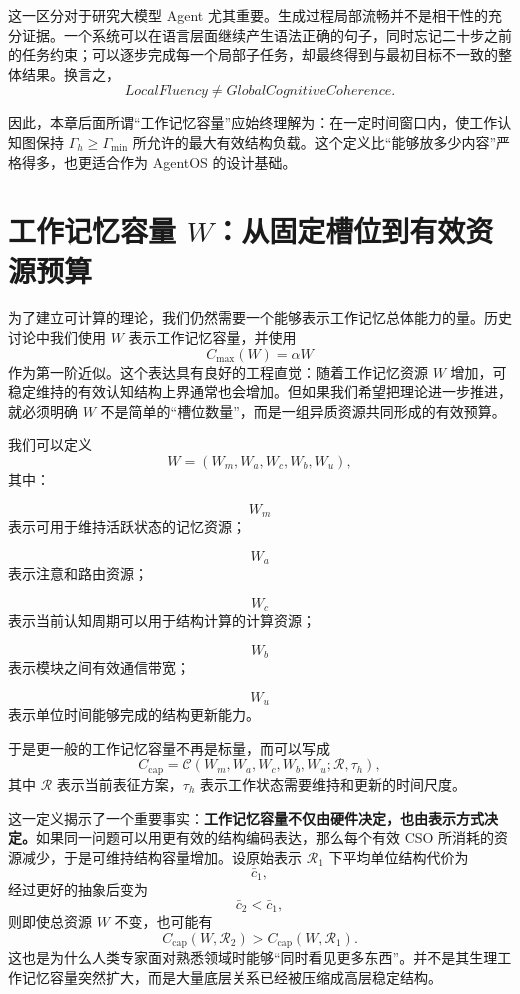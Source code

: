 这一区分对于研究大模型 Agent 尤其重要。生成过程局部流畅并不是相干性的充分证据。一个系统可以在语言层面继续产生语法正确的句子，同时忘记二十步之前的任务约束；可以逐步完成每一个局部子任务，却最终得到与最初目标不一致的整体结果。换言之，
\[
\boxed{
LocalFluency
\neq
GlobalCognitiveCoherence.
}
\]

因此，本章后面所谓“工作记忆容量”应始终理解为：在一定时间窗口内，使工作认知图保持 $\Gamma_h\geq\Gamma_{\min}$ 所允许的最大有效结构负载。这个定义比“能够放多少内容”严格得多，也更适合作为 AgentOS 的设计基础。


\section{工作记忆容量 $W$：从固定槽位到有效资源预算}
\label{sec:working-memory-W}

为了建立可计算的理论，我们仍然需要一个能够表示工作记忆总体能力的量。历史讨论中我们使用 $W$ 表示工作记忆容量，并使用
\[
C_{\max}(W)=\alpha W
\]
作为第一阶近似。这个表达具有良好的工程直觉：随着工作记忆资源 $W$ 增加，可稳定维持的有效认知结构上界通常也会增加。但如果我们希望把理论进一步推进，就必须明确 $W$ 不是简单的“槽位数量”，而是一组异质资源共同形成的有效预算。

我们可以定义
\[
W
=
\left(
W_m,
W_a,
W_c,
W_b,
W_u
\right),
\]
其中：

\[
W_m
\]
表示可用于维持活跃状态的记忆资源；

\[
W_a
\]
表示注意和路由资源；

\[
W_c
\]
表示当前认知周期可以用于结构计算的计算资源；

\[
W_b
\]
表示模块之间有效通信带宽；

\[
W_u
\]
表示单位时间能够完成的结构更新能力。

于是更一般的工作记忆容量不再是标量，而可以写成
\[
C_{\mathrm{cap}}
=
\mathcal{C}
\left(
W_m,W_a,W_c,W_b,W_u;
\mathcal{R},\tau_h
\right),
\]
其中 $\mathcal{R}$ 表示当前表征方案，$\tau_h$ 表示工作状态需要维持和更新的时间尺度。

这一定义揭示了一个重要事实：\textbf{工作记忆容量不仅由硬件决定，也由表示方式决定。}如果同一问题可以用更有效的结构编码表达，那么每个有效 CSO 所消耗的资源减少，于是可维持结构容量增加。设原始表示 $\mathcal{R}_1$ 下平均单位结构代价为
\[
\bar c_1,
\]
经过更好的抽象后变为
\[
\bar c_2<\bar c_1,
\]
则即使总资源 $W$ 不变，也可能有
\[
C_{\mathrm{cap}}(W,\mathcal R_2)
>
C_{\mathrm{cap}}(W,\mathcal R_1).
\]
这也是为什么人类专家面对熟悉领域时能够“同时看见更多东西”。并不是其生理工作记忆容量突然扩大，而是大量底层关系已经被压缩成高层稳定结构。

